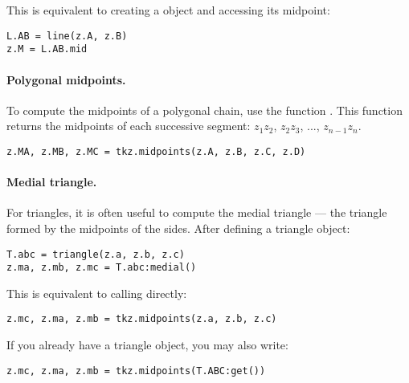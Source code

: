 This is equivalent to creating a  object and accessing its midpoint:

\begin{mybox}
\begin{verbatim}
L.AB = line(z.A, z.B)
z.M = L.AB.mid
\end{verbatim}
\end{mybox}

\paragraph{Polygonal midpoints.}
To compute the midpoints of a polygonal chain, use the function . This function returns the midpoints of each successive segment: $z_1z_2$, $z_2z_3$, ..., $z_{n-1}z_n$.

\begin{mybox}
\begin{verbatim}
z.MA, z.MB, z.MC = tkz.midpoints(z.A, z.B, z.C, z.D)
\end{verbatim}
\end{mybox}

\paragraph{Medial triangle.}
For triangles, it is often useful to compute the medial triangle — the triangle formed by the midpoints of the sides. After defining a triangle object:

\begin{mybox}
\begin{verbatim}
T.abc = triangle(z.a, z.b, z.c)
z.ma, z.mb, z.mc = T.abc:medial()
\end{verbatim}
\end{mybox}

This is equivalent to calling  directly:

\begin{mybox}
\begin{verbatim}
z.mc, z.ma, z.mb = tkz.midpoints(z.a, z.b, z.c)
\end{verbatim}
\end{mybox}

If you already have a triangle object, you may also write:

\begin{mybox}
\begin{verbatim}
z.mc, z.ma, z.mb = tkz.midpoints(T.ABC:get())
\end{verbatim}
\end{mybox}


